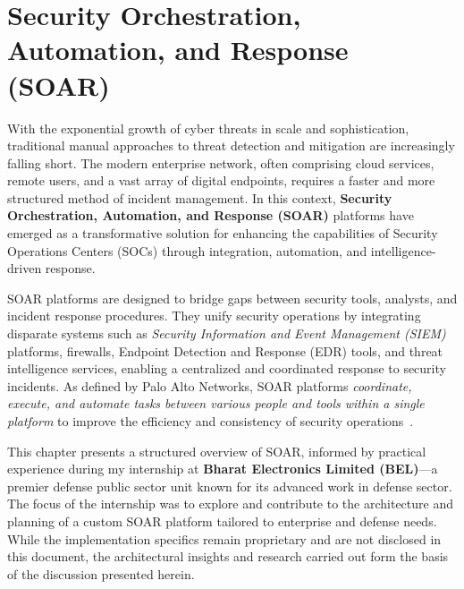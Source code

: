 \chapter{Security Orchestration, Automation, and Response (SOAR)}

With the exponential growth of cyber threats in scale and sophistication, traditional manual approaches to threat detection and mitigation are increasingly falling short. The modern enterprise network, often comprising cloud services, remote users, and a vast array of digital endpoints, requires a faster and more structured method of incident management. In this context, \textbf{Security Orchestration, Automation, and Response (SOAR)} platforms have emerged as a transformative solution for enhancing the capabilities of Security Operations Centers (SOCs) through integration, automation, and intelligence-driven response.

SOAR platforms are designed to bridge gaps between security tools, analysts, and incident response procedures. They unify security operations by integrating disparate systems such as \textit{Security Information and Event Management (SIEM)} platforms, firewalls, Endpoint Detection and Response (EDR) tools, and threat intelligence services, enabling a centralized and coordinated response to security incidents. As defined by Palo Alto Networks, SOAR platforms \textit{coordinate, execute, and automate tasks between various people and tools within a single platform} to improve the efficiency and consistency of security operations~\cite{paloalto}.

This chapter presents a structured overview of SOAR, informed by practical experience during my internship at \textbf{Bharat Electronics Limited (BEL)}—a premier defense public sector unit known for its advanced work in defense sector. The focus of the internship was to explore and contribute to the architecture and planning of a custom SOAR platform tailored to enterprise and defense needs. While the implementation specifics remain proprietary and are not disclosed in this document, the architectural insights and research carried out form the basis of the discussion presented herein.


